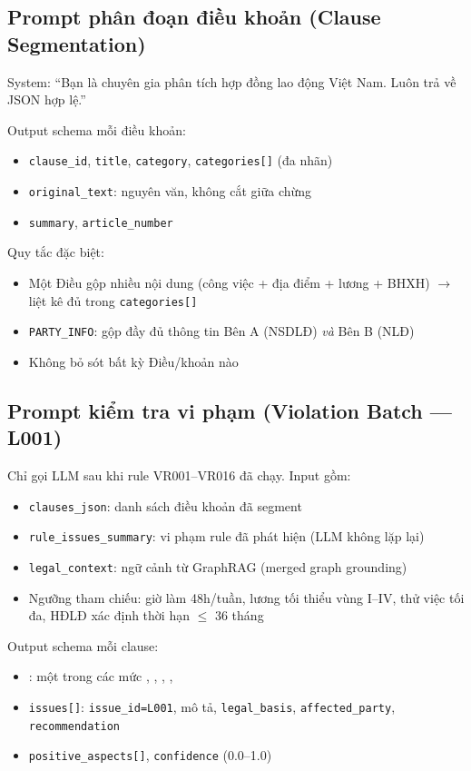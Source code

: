 \documentclass[../DoAn.tex]{subfiles}
\begin{document}
\subsection{Prompt phân đoạn điều khoản (Clause Segmentation)}

System: ``Bạn là chuyên gia phân tích hợp đồng lao động Việt Nam. Luôn trả về JSON hợp lệ.''

Output schema mỗi điều khoản:
\begin{itemize}[nosep, leftmargin=*]
    \item \texttt{clause\_id}, \texttt{title}, \texttt{category}, \texttt{categories[]} (đa nhãn)
    \item \texttt{original\_text}: nguyên văn, không cắt giữa chừng
    \item \texttt{summary}, \texttt{article\_number}
\end{itemize}

Quy tắc đặc biệt:
\begin{itemize}[nosep, leftmargin=*]
    \item Một Điều gộp nhiều nội dung (công việc + địa điểm + lương + BHXH) $\rightarrow$ liệt kê đủ trong \texttt{categories[]}
    \item \texttt{PARTY\_INFO}: gộp đầy đủ thông tin Bên A (NSDLĐ) \emph{và} Bên B (NLĐ)
    \item Không bỏ sót bất kỳ Điều/khoản nào
\end{itemize}

\subsection{Prompt kiểm tra vi phạm (Violation Batch --- L001)}

Chỉ gọi LLM sau khi rule VR001--VR016 đã chạy. Input gồm:
\begin{itemize}[nosep, leftmargin=*]
    \item \texttt{clauses\_json}: danh sách điều khoản đã segment
    \item \texttt{rule\_issues\_summary}: vi phạm rule đã phát hiện (LLM không lặp lại)
    \item \texttt{legal\_context}: ngữ cảnh từ GraphRAG (merged graph grounding)
    \item Ngưỡng tham chiếu: giờ làm 48h/tuần, lương tối thiểu vùng I--IV, thử việc tối đa, HĐLĐ xác định thời hạn $\leq$ 36 tháng
\end{itemize}

Output schema mỗi clause:
\begin{itemize}[nosep, leftmargin=*]
    \item {}: một trong các mức , , , , 
    \item \texttt{issues[]}: \texttt{issue\_id=L001}, mô tả, \texttt{legal\_basis}, \texttt{affected\_party}, \texttt{recommendation}
    \item \texttt{positive\_aspects[]}, \texttt{confidence} (0.0--1.0)
\end{itemize}
\end{document}
